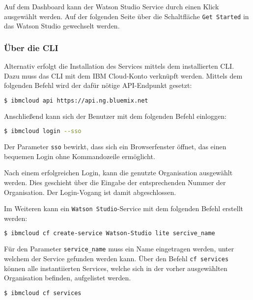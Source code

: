 Auf dem Dashboard kann der Watson Studio Service durch einen Klick ausgewählt werden. Auf der folgenden Seite über die
Schaltfläche \texttt{Get Started} in das Watson Studio gewechselt werden.

\subsubsection*{Über die CLI}
Alternativ erfolgt die Installation des Services mittels dem installierten CLI. Dazu muss das CLI mit dem IBM
Cloud-Konto verknüpft werden. Mittels dem folgenden Befehl wird der dafür nötige API-Endpunkt gesetzt:

\begin{lstlisting}[language=bash, caption=Setzen des API Targets, label=Setzen des API Targets]
    $ ibmcloud api https://api.ng.bluemix.net
\end{lstlisting}

Anschließend kann sich der Benutzer mit dem folgenden Befehl einloggen:

\begin{lstlisting}[language=bash, caption=Login über CLI und Single Sign-on, label=Login über CLI und SSO]
    $ ibmcloud login --sso
\end{lstlisting}

Der Parameter \texttt{sso} bewirkt, dass sich ein Browserfenster öffnet, das einen bequemen Login ohne Kommandozeile
ermöglicht.

Nach einem erfolgreichen Login, kann die genutzte Organisation ausgewählt werden. Dies geschieht über die Eingabe der
entsprechenden Nummer der Organisation. Der Login-Vogang ist damit abgeschlossen.

Im Weiteren kann ein \texttt{Watson Studio}-Service mit dem folgenden Befehl erstellt werden:

\begin{lstlisting}[language=bash, caption=Instanziierung des Watson Studio Services, label=Instanziierung des Watson Studio Services]
    $ ibmcloud cf create-service Watson-Studio lite sercive_name
\end{lstlisting}

Für den Parameter \texttt{service\_name} muss ein Name eingetragen werden, unter welchem der Service gefunden werden kann.
Über den Befehl \texttt{cf services} können alle instantiierten Services, welche sich in der vorher ausgewählten
Organisation befinden, aufgelistet werden.

\begin{lstlisting}[language=bash, caption=Auflisten aller Services, label=Auflisten aller Services]
    $ ibmcloud cf services
\end{lstlisting}

